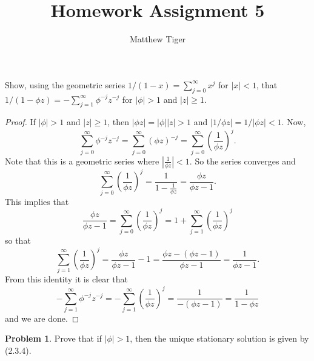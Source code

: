 \documentclass[12pt]{article}
\title{Homework Assignment 5}
\author{Matthew Tiger}
\theoremstyle{definition}
\newtheorem{problem}{Problem}
\newenvironment{custompbm}[1]
  {\renewcommand\theproblem{#1}\problem}
  {\endproblem}
\begin{document}
\maketitle


\begin{custompbm}{2.7}
   Show, using the geometric series $1/(1-x) = \sum_{j=0}^\infty x^j$ for $|x| < 1$,
   that $1/(1-\phi z) = -\sum_{j=1}^\infty \phi^{-j} z^{-j}$ for $|\phi| > 1$ and $|z| \geq 1$.
\end{custompbm}

\begin{proof}
  If $|\phi| > 1$ and $|z| \geq 1$, then $|\phi z| = |\phi| |z| > 1$ and
  $|1 / \phi z| = 1 / |\phi z|  < 1$. Now,
  \[
    \sum_{j=0}^\infty \phi^{-j} z ^ {-j} = \sum_{j=0}^\infty (\phi z )^{-j} = \sum_{j=0}^\infty \left(\frac{1}{\phi z}\right)^j.
  \]
  Note that this is a geometric series where $|\frac{1}{\phi z}| < 1$. So the
  series converges and
  \[
    \sum_{j=0}^\infty \left(\frac{1}{\phi z}\right)^j = \frac{1}{1 - \frac{1}{\phi z}} = \frac{\phi z}{\phi z - 1}.
  \]
  This implies that
  \[
    \frac{\phi z}{\phi z - 1}  = \sum_{j=0}^\infty \left(\frac{1}{\phi z}\right)^j = 1 + \sum_{j=1}^\infty \left(\frac{1}{\phi z}\right)^j
  \]
  so that
  \[
    \sum_{j=1}^\infty \left(\frac{1}{\phi z}\right)^j = \frac{\phi z}{\phi z - 1} - 1 = \frac{\phi z - (\phi z - 1)}{\phi z - 1} = \frac{1}{\phi z - 1}.
  \]
  From this identity it is clear that
  \[
    - \sum_{j=1}^\infty \phi^{-j} z ^ {-j} = - \sum_{j=1}^\infty \left(\frac{1}{\phi z}\right)^j = \frac{1}{-(\phi z -1)} = \frac{1}{1 - \phi z}
  \]
  and we are done.
\end{proof}


\begin{problem}
  Prove that if $|\phi|>1$, then the unique stationary solution is given by (2.3.4).
\end{problem}
\end{document}
